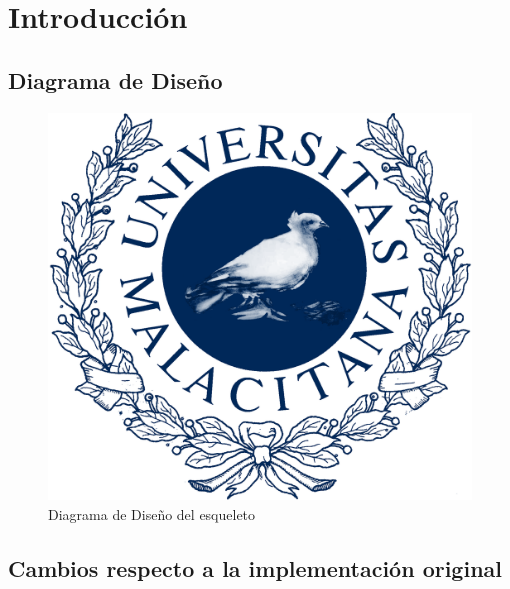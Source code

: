 \section{Introducción}


\subsection{Diagrama de Diseño}

\begin{figure}[H]
    \centering
     \includegraphics[width=1\linewidth]{assets/umaLogo.png}
     \caption{Diagrama de Diseño del esqueleto}
\end{figure}

\subsection{Cambios respecto a la implementación original}

